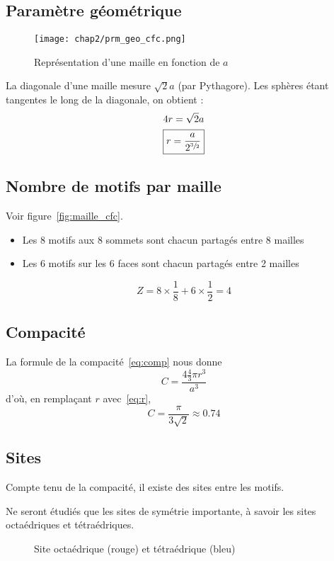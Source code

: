 \subsection{Paramètre géométrique}
\begin{figure}
    \centering
    \texttt{[image: chap2/prm\_geo\_cfc.png]}
    \caption{Représentation d'une maille en fonction de $a$}\label{fig:prm_geo_cfc}
\end{figure}

La diagonale d'une maille mesure $\sqrt{2}a$ (par Pythagore).
Les sphères étant tangentes le long de la diagonale, on obtient :
\begin{gather}
    4r = \sqrt{2}a \\
    \boxed{r = \frac{a}{2^{\sfrac{3}{2}}}} \label{eq:r}
\end{gather}
\subsection{Nombre de motifs par maille}
Voir figure~\ref{fig:maille_cfc}.
\begin{itemize}
    \item Les 8 motifs aux 8 sommets sont chacun partagés
        entre 8 mailles
    \item Les 6 motifs sur les 6 faces sont chacun partagés
        entre 2 mailles
\end{itemize}
\begin{equation}
    Z = 8 \times \frac{1}{8} + 6 \times \frac{1}{2} = 4
\end{equation}
\subsection{Compacité}
La formule de la compacité~\ref{eq:comp} nous donne
\begin{equation*}
    C = \frac{4 \frac{4}{3} \pi r^3}{a^3}
\end{equation*}
d'où, en remplaçant $r$ avec~\ref{eq:r},
\begin{equation}
    \boxed{C = \frac{\pi}{3\sqrt{2}} \approx 0.74}
\end{equation}

\subsection{Sites}
Compte tenu de la compacité, il existe des sites entre les motifs.
\begin{rem}
    Ne seront étudiés que les sites de symétrie importante,
    à savoir les sites octaédriques et tétraédriques.
\end{rem}
\begin{figure}
    \centering
    
    \caption[Sites d'une structure cfc]
    {Site octaédrique (rouge) et tétraédrique (bleu)}\label{fig:2_cfc_sites}
\end{figure}
